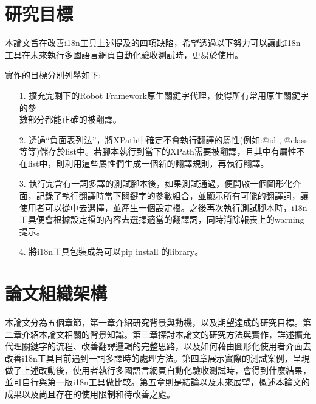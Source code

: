 \section{研究目標}
本論文旨在改善i18n工具上述提及的四項缺陷，希望透過以下努力可以讓此I18n\\
工具在未來執行多國語言網頁自動化驗收測試\cite{se}\cite{testduo}時，更易於使用。

實作的目標分別列舉如下:
\begin{itemize}
\item[1.] 擴充完剩下的Robot Framework原生關鍵字代理，使得所有常用原生關鍵字的參\\
數部分都能正確的被翻譯。
\item[2.] 透過“負面表列法”，將XPath中確定不會執行翻譯的屬性(例如:@id , @class等等)儲存於list中。若腳本執行到當下的XPath需要被翻譯，且其中有屬性不在list中，則利用這些屬性們生成一個新的翻譯規則，再執行翻譯。
\item[3.] 執行完含有一詞多譯的測試腳本後，如果測試通過，便開啟一個圖形化介面，記錄了執行翻譯時當下關鍵字的參數組合，並顯示所有可能的翻譯詞，讓使用者可以從中去選擇，並產生一個設定檔。之後再次執行測試腳本時，i18n工具便會根據設定檔的內容去選擇適當的翻譯詞，同時消除報表上的warning提示。 
\item[4.] 將i18n工具包裝成為可以pip\cite{PIP} install 的library。
\end{itemize}

\section{論文組織架構}
本論文分為五個章節，第一章介紹研究背景與動機，以及期望達成的研究目標。第二章介紹本論文相關的背景知識。第三章探討本論文的研究方法與實作，詳述擴充代理關鍵字的流程、改善翻譯邏輯的完整思路，以及如何藉由圖形化使用者介面去改善i18n工具目前遇到一詞多譯時的處理方法。第四章展示實際的測試案例，呈現做了上述改動後，使用者執行多國語言網頁自動化驗收測試時，會得到什麼結果，並可自行與第一版i18n工具\cite{i18n}做比較。第五章則是結論以及未來展望，概述本論文的成果以及尚且存在的使用限制和待改善之處。
